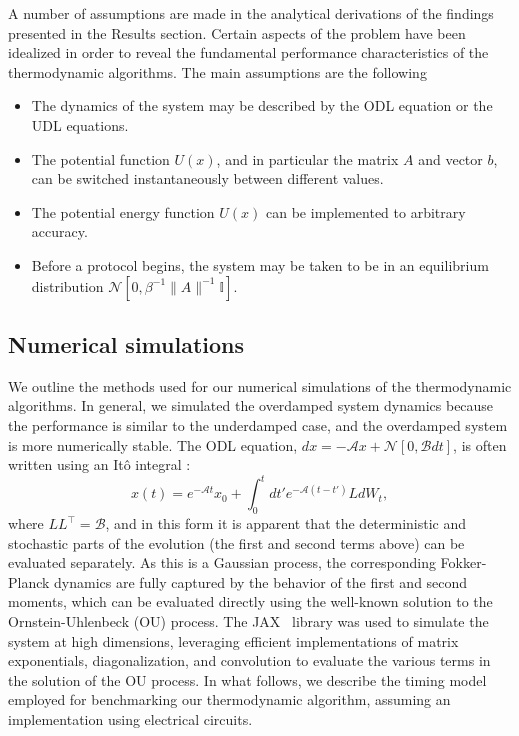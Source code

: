 \documentclass[prx,onecolumn,floatfix,longbibliography,notitlepage, nofootinbib,12pt]{revtex4-2}
\begin{document}
A number of assumptions are made in the analytical derivations of the findings presented in the Results section. Certain aspects of the problem have been idealized in order to reveal the fundamental performance characteristics of the thermodynamic algorithms. The main assumptions are the following
\begin{itemize}
    \item The dynamics of the system may be described by the ODL equation or the UDL equations.
    \item The potential function $U(x)$, and in particular the matrix $A$ and vector $b$, can be switched instantaneously between different values.
    \item The potential energy function $U(x)$ can be implemented to arbitrary accuracy.
    \item Before a protocol begins, the system may be taken to be in an equilibrium distribution $\mathcal{N}[0, \beta^{-1}\|A\|^{-1}\mathbb{I}]$.
\end{itemize}







\subsection{Numerical simulations}

We outline the methods used for our numerical simulations of the thermodynamic algorithms. In general, we simulated the overdamped system dynamics because the performance is similar to the underdamped case, and the overdamped system is more numerically stable. The ODL equation, $dx = - \mathcal{A}x + \mathcal{N}[0, \mathcal{B} dt]$, is often written using an Itô integral \cite{gardiner1985handbook}:
\begin{equation}
\label{eq:ou-process-ito}
    x(t) = e^{-\mathcal{A} t}x_0 + \int_{0}^t dt' e^{-\mathcal{A}(t-t')} Ld W_t,
\end{equation}
where $L L^\intercal=\mathcal{B}$, and in this form it is apparent that the deterministic and stochastic parts of the evolution (the first and second terms above) can be evaluated separately. As this is a Gaussian process, the corresponding Fokker-Planck dynamics are fully captured by the behavior of the first and second moments, which can be evaluated directly using the well-known solution to the Ornstein-Uhlenbeck (OU) process. The JAX~\cite{frostig2018compiling} library was used to simulate the system at high dimensions, leveraging efficient implementations of matrix exponentials, diagonalization, and convolution to evaluate the various terms in the solution of the OU process. In what follows, we describe the timing model employed for benchmarking our thermodynamic algorithm, assuming an implementation using electrical circuits.
\end{document}
